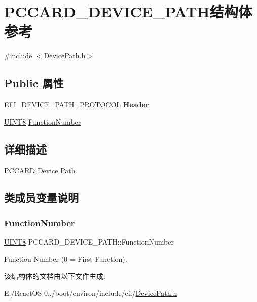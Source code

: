 \hypertarget{struct_p_c_c_a_r_d___d_e_v_i_c_e___p_a_t_h}{}\section{P\+C\+C\+A\+R\+D\+\_\+\+D\+E\+V\+I\+C\+E\+\_\+\+P\+A\+T\+H结构体 参考}
\label{struct_p_c_c_a_r_d___d_e_v_i_c_e___p_a_t_h}


{\ttfamily \#include $<$Device\+Path.\+h$>$}

\subsection*{Public 属性}
\begin{DoxyCompactItemize}
\item 
\mbox{\label{struct_p_c_c_a_r_d___d_e_v_i_c_e___p_a_t_h_ae48894c75ada24d63f50c0a1b02d81ba}} 
\hyperlink{struct_e_f_i___d_e_v_i_c_e___p_a_t_h___p_r_o_t_o_c_o_l}{E\+F\+I\+\_\+\+D\+E\+V\+I\+C\+E\+\_\+\+P\+A\+T\+H\+\_\+\+P\+R\+O\+T\+O\+C\+OL} {\bfseries Header}
\item 
\hyperlink{_processor_bind_8h_ab27e9918b538ce9d8ca692479b375b6a}{U\+I\+N\+T8} \hyperlink{struct_p_c_c_a_r_d___d_e_v_i_c_e___p_a_t_h_a01f934f15c29c24a3ee6b2e2d09ad062}{Function\+Number}
\end{DoxyCompactItemize}


\subsection{详细描述}
P\+C\+C\+A\+RD Device Path. 

\subsection{类成员变量说明}
\mbox{\label{struct_p_c_c_a_r_d___d_e_v_i_c_e___p_a_t_h_a01f934f15c29c24a3ee6b2e2d09ad062}} 
\subsubsection{\texorpdfstring{Function\+Number}{FunctionNumber}}
{\footnotesize\ttfamily \hyperlink{_processor_bind_8h_ab27e9918b538ce9d8ca692479b375b6a}{U\+I\+N\+T8} P\+C\+C\+A\+R\+D\+\_\+\+D\+E\+V\+I\+C\+E\+\_\+\+P\+A\+T\+H\+::\+Function\+Number}

Function Number (0 = First Function). 

该结构体的文档由以下文件生成\+:\begin{DoxyCompactItemize}
\item 
E\+:/\+React\+O\+S-\/0../boot/environ/include/efi/\hyperlink{_device_path_8h}{Device\+Path.\+h}\end{DoxyCompactItemize}
